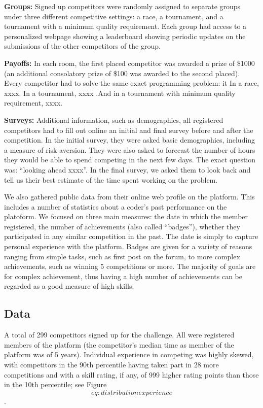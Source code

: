 \documentclass[12pt,]{article}
\begin{document}
\textbf{Groups:} Signed up competitors were randomly assigned to
separate groups under three different competitive settings: a race, a
tournament, and a tournament with a minimum quality requirement. Each
group had access to a personalized webpage showing a leaderboard showing
periodic updates on the submissions of the other competitors of the
group.

\textbf{Payoffs:} In each room, the first placed competitor was awarded
a prize of \$1000 (an additional consolatory prize of \$100 was awarded
to the second placed). Every competitor had to solve the same exact
programming problem: it In a race, xxxx. In a tournament, xxxx .And in a
tournament with minimum quality requirement, xxxx.

\textbf{Surveys:} Additional information, such as demographics, all
registered competitors had to fill out online an initial and final
survey before and after the competition. In the initial survey, they
were asked basic demographics, including a measure of risk aversion.
They were also asked to forecast the number of hours they would be able
to spend competing in the next few days. The exact question was:
``looking ahead xxxx''. In the final survey, we asked them to look back
and tell us their best estimate of the time spent working on the
problem.

We also gathered public data from their online web profile on the
platform. This includes a number of statistics about a coder's past
performance on the platoform. We focused on three main measures: the
date in which the member registered, the number of achievements (also
called ``badges''), whether they participated in any similar competition
in the past. The date is simply to capture personal experience with the
platform. Badges are given for a variety of reasons ranging from simple
tasks, such as first post on the forum, to more complex achievements,
such as winning 5 competitions or more. The majority of goals are for
complex achievement, thus having a high number of achievements can be
regarded as a good measure of high skills.

\subsection{Data}\label{data}

A total of 299 competitors signed up for the challenge. All were
registered members of the platform (the competitor's median time as
member of the platform was of 5 years). Individual experience in
competing was highly skewed, with competitors in the 90th percentile
having taken part in 28 more competitions and with a skill rating, if
any, of 999 higher rating points than those in the 10th percentile; see
Figure \[eq: distribution experience\].
\end{document}
